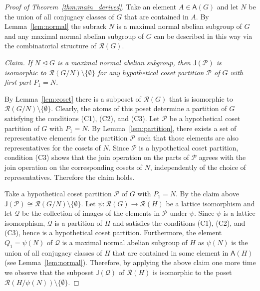 \documentclass[a4paper,12pt]{article}
\theoremstyle{definition}
\theoremstyle{remark}
\begin{document}
\begin{proof}[Proof of Theorem~\ref{thm:main_derived}]
  Take an element $A\in \mathsf{A}(G)$ and let $N$ be the union of all conjugacy classes of $G$ that are contained in $A$. By Lemma~\ref{lem:normal} the subrack $N$ is a maximal normal abelian subgroup of $G$ and any maximal normal abelian subgroup of $G$ can be described in this way via the combinatorial structure of $\mathcal{R}(G)$. 

  \medskip
  \noindent
  \emph{Claim. If $N\trianglelefteq G$ is a maximal normal abelian subgroup, then $\mathsf{J}(\mathcal{P})$ is isomorphic to $\mathcal{R}(G/N)\setminus \{\emptyset\}$ for any hypothetical coset partition $\mathcal{P}$ of $G$ with first part $P_1 = N$.}

  \medskip
  By Lemma~\ref{lem:coset} there is a subposet of $\mathcal{R}(G)$ that is isomorphic to $\mathcal{R}(G/N)\setminus \{\emptyset\}$. Clearly, the atoms of this poset determine a partition of $G$ satisfying the conditions (C1), (C2), and (C3). Let $\mathcal{P}$ be a hypothetical coset partition of $G$ with $P_1 = N$. By Lemma~\ref{lem:partition}, there exists a set of representative elements for the partition $\mathcal{P}$ such that those elements are also representatives for the cosets of $N$. Since $\mathcal{P}$ is a hypothetical coset partition, condition (C3) shows that the join operation on the parts of $\mathcal{P}$ agrees with the join operation on the corresponding cosets of $N$, independently of the choice of representatives. Therefore the claim holds.

  \medskip
  Take a hypothetical coset partition $\mathcal{P}$ of $G$ with $P_1 = N$. By the claim above $\mathsf{J}(\mathcal{P}) \cong \mathcal{R}(G/N)\setminus \{\emptyset\}$. Let $\psi\colon \mathcal{R}(G)\to \mathcal{R}(H)$ be a lattice isomorphism and let $\mathcal{Q}$ be the collection of images of the elements in $\mathcal{P}$ under $\psi$. Since $\psi$ is a lattice isomorphism, $\mathcal{Q}$ is a partition of $H$ and satisfies the conditions (C1), (C2), and (C3), hence is a hypothetical coset partition. Furthermore, the element $Q_1 = \psi(N)$ of $\mathcal{Q}$ is a maximal normal abelian subgroup of $H$ as $\psi(N)$ is the union of all conjugacy classes of $H$ that are contained in some element in $\mathsf{A}(H)$ (see Lemma~\ref{lem:normal}). Therefore, by applying the above claim one more time we observe that the subposet $\mathsf{J}(\mathcal{Q})$ of $\mathcal{R}(H)$ is isomorphic to the poset $\mathcal{R}(H/\psi(N))\setminus \{\emptyset\}$. 
  

\end{proof}
\end{document}
